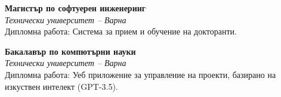 \textbf{Магистър по софтуерен инженеринг}  \\
\textit{Технически университет – Варна} \\
\footnotesize Дипломна работа: Система за прием и обучение на докторанти. \par

\vspace{1ex}
\textbf{Бакалавър по компютърни науки}  \\
\textit{Технически университет – Варна} \\
\footnotesize Дипломна работа: Уеб приложение за управление на проекти, базирано на изкуствен интелект (GPT-3.5).

